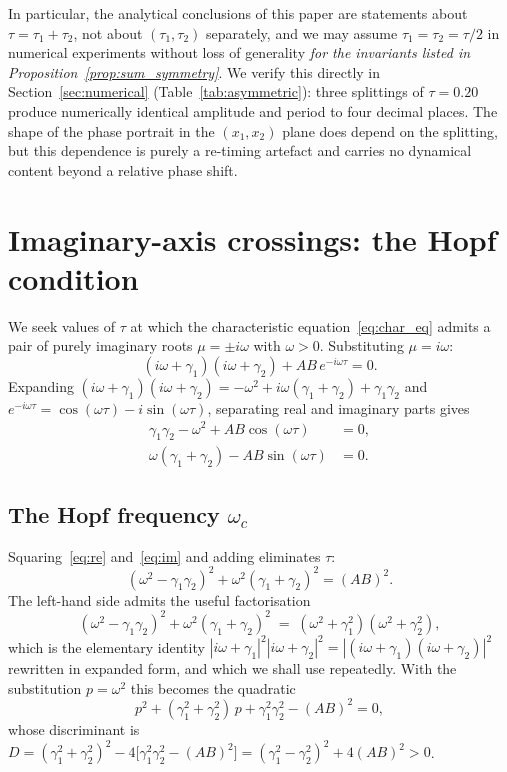 \documentclass[sn-mathphys,Numbered]{sn-jnl}
\theoremstyle{thmstyleone}
\theoremstyle{thmstyletwo}
\theoremstyle{thmstylethree}
\begin{document}
In particular, the analytical conclusions of this paper are statements
about $\tau=\tau_1+\tau_2$, not about $(\tau_1,\tau_2)$ separately, and
we may assume $\tau_1=\tau_2=\tau/2$ in numerical experiments without
loss of generality \emph{for the invariants listed in
Proposition~\ref{prop:sum_symmetry}}. We verify this directly in
Section~\ref{sec:numerical} (Table~\ref{tab:asymmetric}): three
splittings of $\tau=0.20$ produce numerically identical amplitude and
period to four decimal places. The shape of the phase portrait in the
$(x_1,x_2)$ plane does depend on the splitting, but this dependence is
purely a re-timing artefact and carries no dynamical content beyond a
relative phase shift.

\section{Imaginary-axis crossings: the Hopf condition}
\label{sec:hopf}

We seek values of $\tau$ at which the characteristic
equation~\eqref{eq:char_eq} admits a pair of purely imaginary roots
$\mu=\pm i\omega$ with $\omega>0$. Substituting $\mu=i\omega$:
\[
(i\omega+\gamma_1)(i\omega+\gamma_2) + AB\,e^{-i\omega\tau} = 0.
\]
Expanding $(i\omega+\gamma_1)(i\omega+\gamma_2) = -\omega^2
+i\omega(\gamma_1+\gamma_2) + \gamma_1\gamma_2$ and
$e^{-i\omega\tau}=\cos(\omega\tau)-i\sin(\omega\tau)$, separating real and
imaginary parts gives
\begin{align}
\gamma_1\gamma_2-\omega^2 + AB\cos(\omega\tau) &= 0,\label{eq:re}\\
\omega(\gamma_1+\gamma_2) - AB\sin(\omega\tau) &= 0.\label{eq:im}
\end{align}

\subsection{The Hopf frequency $\omega_c$}

Squaring~\eqref{eq:re} and~\eqref{eq:im} and adding eliminates $\tau$:
\begin{equation}
(\omega^2-\gamma_1\gamma_2)^2 + \omega^2(\gamma_1+\gamma_2)^2 = (AB)^2.
\label{eq:omega_eq}
\end{equation}
The left-hand side admits the useful factorisation
\begin{equation}
(\omega^2-\gamma_1\gamma_2)^2 + \omega^2(\gamma_1+\gamma_2)^2
\;=\; (\omega^2+\gamma_1^2)(\omega^2+\gamma_2^2),
\label{eq:LHS_factorisation}
\end{equation}
which is the elementary identity
$|i\omega+\gamma_1|^2|i\omega+\gamma_2|^2 = |(i\omega+\gamma_1)(i\omega+
\gamma_2)|^2$ rewritten in expanded form, and which we shall use
repeatedly. With the substitution $p=\omega^2$ this becomes the
quadratic
\begin{equation}
p^2 + (\gamma_1^2+\gamma_2^2)\,p + \gamma_1^2\gamma_2^2 - (AB)^2 = 0,
\label{eq:p_quadratic}
\end{equation}
whose discriminant is
$D = (\gamma_1^2+\gamma_2^2)^2 - 4\bigl[\gamma_1^2\gamma_2^2-(AB)^2\bigr]
= (\gamma_1^2-\gamma_2^2)^2 + 4(AB)^2 > 0$.
\end{document}
